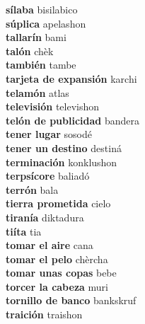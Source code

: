 \textbf{ sílaba  } bisilabico \\
\textbf{ súplica  } apelashon \\
\textbf{ tallarín  } bami \\
\textbf{ talón  } chèk \\
\textbf{ también  } tambe \\
\textbf{ tarjeta de expansión  } karchi \\
\textbf{ telamón  } atlas \\
\textbf{ televisión  } televishon \\
\textbf{ telón de publicidad  } bandera \\
\textbf{ tener lugar  } sosodé \\
\textbf{ tener un destino  } destiná \\
\textbf{ terminación  } konklushon \\
\textbf{ terpsícore  } baliadó \\
\textbf{ terrón  } bala \\
\textbf{ tierra prometida  } cielo \\
\textbf{ tiranía  } diktadura \\
\textbf{ tiíta  } tia \\
\textbf{ tomar el aire  } cana \\
\textbf{ tomar el pelo  } chèrcha \\
\textbf{ tomar unas copas  } bebe \\
\textbf{ torcer la cabeza  } muri \\
\textbf{ tornillo de banco  } bankskruf \\
\textbf{ traición  } traishon \\
